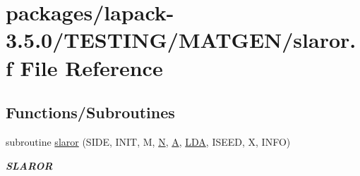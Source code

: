 \hypertarget{slaror_8f}{}\section{packages/lapack-\/3.5.0/\+T\+E\+S\+T\+I\+N\+G/\+M\+A\+T\+G\+E\+N/slaror.f File Reference}
\label{slaror_8f}
\subsection*{Functions/\+Subroutines}
\begin{DoxyCompactItemize}
\item 
subroutine \hyperlink{group__real__matgen_ga2e51dc8345db05a4d5f932416758a3f1}{slaror} (S\+I\+D\+E, I\+N\+I\+T, M, \hyperlink{polmisc_8c_a0240ac851181b84ac374872dc5434ee4}{N}, \hyperlink{classA}{A}, \hyperlink{example__user_8c_ae946da542ce0db94dced19b2ecefd1aa}{L\+D\+A}, I\+S\+E\+E\+D, X, I\+N\+F\+O)
\begin{DoxyCompactList}\small\item\em {\bfseries S\+L\+A\+R\+O\+R} \end{DoxyCompactList}\end{DoxyCompactItemize}
